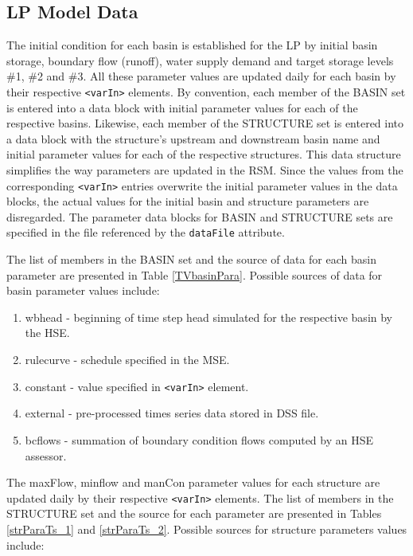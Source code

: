 \subsection{LP Model Data}

The initial condition for each basin is established for the LP by
initial basin storage, boundary flow (runoff), water supply demand and
target storage levels \#1, \#2 and \#3.  All these parameter values
are updated daily for each basin by their respective {\tt <varIn>}
elements. By convention, each member of the BASIN set is entered into
a data block with initial parameter values for each of the respective
basins.  Likewise, each member of the STRUCTURE set is entered into a
data block with the structure's upstream and downstream basin name and
initial parameter values for each of the respective structures.  This
data structure simplifies the way parameters are updated in the RSM.
Since the values from the corresponding {\tt <varIn>} entries
overwrite the initial parameter values in the data blocks, the actual
values for the initial basin and structure parameters are disregarded.
The parameter data blocks for BASIN and STRUCTURE sets are specified
in the file referenced by the {\tt dataFile} attribute.

The list of members in the BASIN set and the source of data for each
basin parameter are presented in Table \ref{TVbasinPara}.  Possible
sources of data for basin parameter values include:

\begin{enumerate}
 
 \item wbhead \-- beginning of time step head simulated for the
   respective basin by the HSE.

 \item rulecurve \-- schedule specified in the MSE.

 \item constant \-- value specified in {\tt <varIn>} element.

 \item external \-- pre-processed times series data stored in DSS file.

 \item bcflows \-- summation of boundary condition flows computed by
   an HSE assessor.

\end{enumerate}

The maxFlow, minflow and manCon parameter values for each structure
are updated daily by their respective {\tt <varIn>} elements.  The
list of members in the STRUCTURE set and the source for each parameter
are presented in Tables \ref {strParaTs_1} and \ref {strParaTs_2}.
Possible sources for structure parameters values include:

